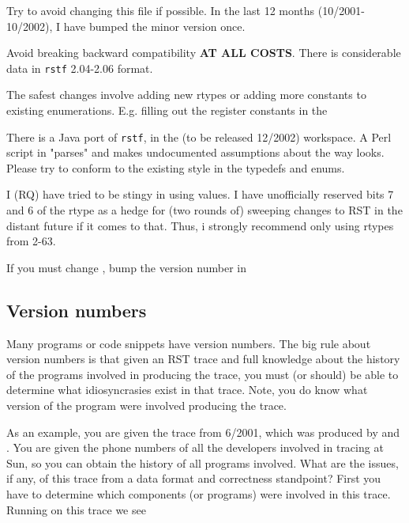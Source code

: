\documentclass[10pt]{article}
\begin{document}
\begin{rqitemize}{0em}
  \item Try to avoid changing this file if possible.
    In the last 12 months (10/2001-10/2002), I have bumped the minor
    version once.
  \item Avoid breaking backward compatibility \textbf{AT ALL COSTS}.
    There is considerable data in \texttt{rstf} 2.04-2.06 format.
  \item The safest changes involve adding new rtypes or adding more constants
    to existing enumerations.  E.g. filling out the register constants
    in the 
  \item There is a Java port of \texttt{rstf}, in the (to be released
  12/2002)  workspace.  A Perl script in 
  "parses"  and makes undocumented assumptions about
  the way  looks.  Please try to conform to the
  existing style in the typedefs and enums.

  \item I (RQ) have tried to be stingy in using  values.
    I have unofficially reserved bits 7 and 6 of the rtype as a hedge for
    (two rounds of) sweeping changes to RST in the distant future if it
    comes to that.  Thus, i strongly recommend only using rtypes from
    2-63.
\end{rqitemize}

If you must change , bump the version number in

\subsection{Version numbers}

Many programs or code snippets have version numbers.  The big rule about
version numbers is that given an RST trace and full knowledge about the
history of the programs involved in producing the trace, you must (or
should) be able to determine what idiosyncrasies exist in that trace.
Note, you do  know what version of the program were involved
producing the trace.

As an example, you are given the trace  from
6/2001, which was produced by  and .
You are given the phone numbers of all the developers involved in
tracing at Sun, so you can obtain the history of all programs involved.
What are the issues, if any, of this trace from a data format and
correctness standpoint?  First you have to determine which components
(or programs) were involved in this trace.  Running  on this trace we see
\end{document}
